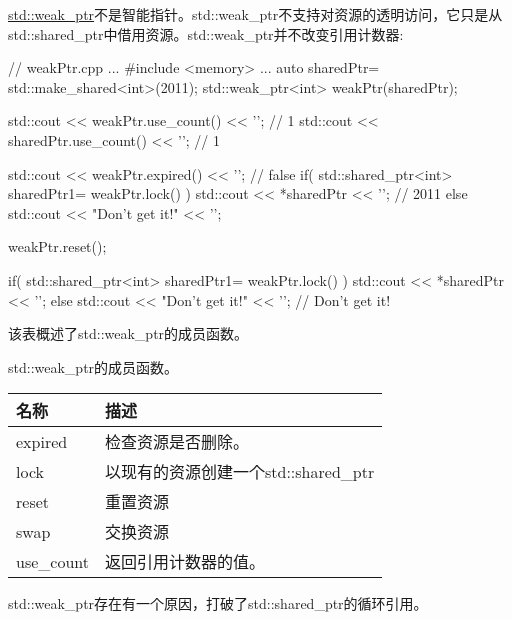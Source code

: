 \href{http://en.cppreference.com/w/cpp/memory/weak_ptr}{std::weak\_ptr}不是智能指针。std::weak\_ptr不支持对资源的透明访问，它只是从std::shared\_ptr中借用资源。std::weak\_ptr并不改变引用计数器:


\begin{cpp}
// weakPtr.cpp
...
#include <memory>
...
auto sharedPtr= std::make_shared<int>(2011);
std::weak_ptr<int> weakPtr(sharedPtr);

std::cout << weakPtr.use_count() << '\n'; // 1
std::cout << sharedPtr.use_count() << '\n'; // 1

std::cout << weakPtr.expired() << '\n'; // false
if( std::shared_ptr<int> sharedPtr1= weakPtr.lock() ) {
	std::cout << *sharedPtr << '\n'; // 2011
}
else{
	std::cout << "Don't get it!" << '\n';
}

weakPtr.reset();

if( std::shared_ptr<int> sharedPtr1= weakPtr.lock() ) {
	std::cout << *sharedPtr << '\n';
}
else{
	std::cout << "Don't get it!" << '\n'; // Don't get it!
}
\end{cpp}

该表概述了std::weak\_ptr的成员函数。

\begin{center}
std::weak\_ptr的成员函数。
\end{center}

\begin{longtable}[c]{|l|l|}
\hline
\textbf{名称} & \textbf{描述}                        \\ \hline
\endfirsthead
%
\endhead
%
expired       & 检查资源是否删除。         \\ \hline
lock          & 以现有的资源创建一个std::shared\_ptr  \\ \hline
reset         & 重置资源                         \\ \hline
swap          & 交换资源                          \\ \hline
use\_count    & 返回引用计数器的值。\\ \hline
\end{longtable}

std::weak\_ptr存在有一个原因，打破了std::shared\_ptr的循环引用。


